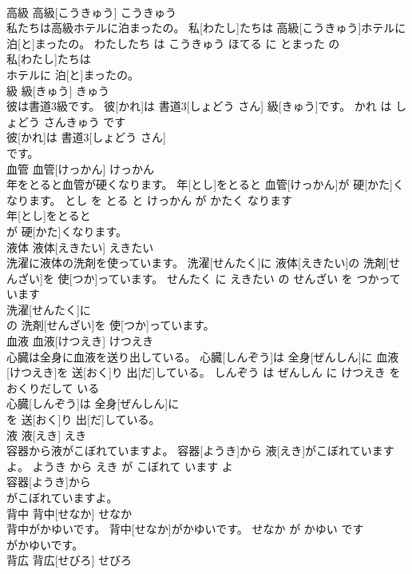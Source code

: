 \documentclass[8pt]{extreport}
\begin{document}
\begin{CJK}{UTF8}{min}
\\	高級	高級[こうきゅう]	こうきゅう	
\\	私たちは高級ホテルに泊まったの。	私[わたし]たちは 高級[こうきゅう]ホテルに 泊[と]まったの。	わたしたち は こうきゅう ほてる に とまった の	
\\	私[わたし]たちは
\\	ホテルに 泊[と]まったの。			
\\	級	級[きゅう]	きゅう	
\\	彼は書道3級です。	彼[かれ]は 書道3[しょどう さん] 級[きゅう]です。	かれ は しょどう さんきゅう です	
\\	彼[かれ]は 書道3[しょどう さん]
\\	です。			
\\	血管	血管[けっかん]	けっかん	
\\	年をとると血管が硬くなります。	年[とし]をとると 血管[けっかん]が 硬[かた]くなります。	とし を とる と けっかん が かたく なります	
\\	年[とし]をとると
\\	が 硬[かた]くなります。			
\\	液体	液体[えきたい]	えきたい	
\\	洗濯に液体の洗剤を使っています。	洗濯[せんたく]に 液体[えきたい]の 洗剤[せんざい]を 使[つか]っています。	せんたく に えきたい の せんざい を つかって います	
\\	洗濯[せんたく]に
\\	の 洗剤[せんざい]を 使[つか]っています。			
\\	血液	血液[けつえき]	けつえき	
\\	心臓は全身に血液を送り出している。	心臓[しんぞう]は 全身[ぜんしん]に 血液[けつえき]を 送[おく]り 出[だ]している。	しんぞう は ぜんしん に けつえき を おくりだして いる	
\\	心臓[しんぞう]は 全身[ぜんしん]に
\\	を 送[おく]り 出[だ]している。			
\\	液	液[えき]	えき	
\\	容器から液がこぼれていますよ。	容器[ようき]から 液[えき]がこぼれていますよ。	ようき から えき が こぼれて います よ	
\\	容器[ようき]から
\\	がこぼれていますよ。			
\\	背中	背中[せなか]	せなか	
\\	背中がかゆいです。	背中[せなか]がかゆいです。	せなか が かゆい です	
\\	がかゆいです。			
\\	背広	背広[せびろ]	せびろ	

\end{CJK}
\end{document}
